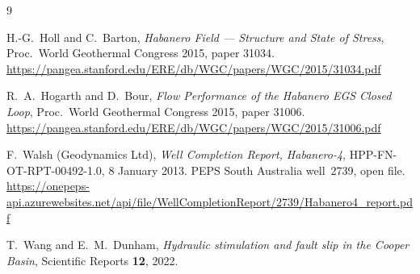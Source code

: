 \documentclass[11pt]{article}
\begin{document}
\begin{thebibliography}{9}

H.-G.~Holl and C.~Barton,
\emph{Habanero Field --- Structure and State of Stress},
Proc.\ World Geothermal Congress 2015, paper 31034.
\url{https://pangea.stanford.edu/ERE/db/WGC/papers/WGC/2015/31034.pdf}

R.~A.~Hogarth and D.~Bour,
\emph{Flow Performance of the Habanero EGS Closed Loop},
Proc.\ World Geothermal Congress 2015, paper 31006.
\url{https://pangea.stanford.edu/ERE/db/WGC/papers/WGC/2015/31006.pdf}

F.~Walsh (Geodynamics Ltd),
\emph{Well Completion Report, Habanero-4},
HPP-FN-OT-RPT-00492-1.0, 8 January 2013. PEPS South Australia well~2739,
open file.
\url{https://onepeps-api.azurewebsites.net/api/file/WellCompletionReport/2739/Habanero4_report.pdf}

T.~Wang and E.~M.~Dunham,
\emph{Hydraulic stimulation and fault slip in the Cooper Basin},
Scientific Reports \textbf{12}, 2022.

\end{thebibliography}
\end{document}
